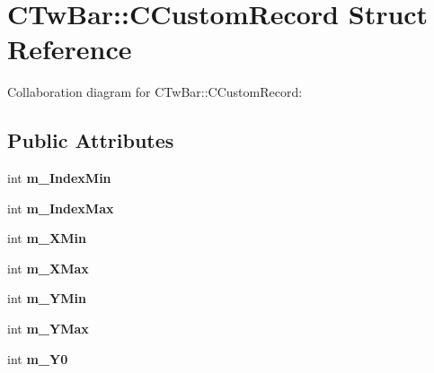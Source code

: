 \hypertarget{struct_c_tw_bar_1_1_c_custom_record}{\section{C\+Tw\+Bar\+:\+:C\+Custom\+Record Struct Reference}
\label{struct_c_tw_bar_1_1_c_custom_record}
}


Collaboration diagram for C\+Tw\+Bar\+:\+:C\+Custom\+Record\+:
\subsection*{Public Attributes}
\begin{DoxyCompactItemize}
\item 
\hypertarget{struct_c_tw_bar_1_1_c_custom_record_a9fc96cdb43061c76566574e1085cc4ac}{int {\bfseries m\+\_\+\+Index\+Min}}\label{struct_c_tw_bar_1_1_c_custom_record_a9fc96cdb43061c76566574e1085cc4ac}

\item 
\hypertarget{struct_c_tw_bar_1_1_c_custom_record_ad8e5f8a30620613c39c8fc06e60280a9}{int {\bfseries m\+\_\+\+Index\+Max}}\label{struct_c_tw_bar_1_1_c_custom_record_ad8e5f8a30620613c39c8fc06e60280a9}

\item 
\hypertarget{struct_c_tw_bar_1_1_c_custom_record_a8c59541807f3da20a45922df8877e466}{int {\bfseries m\+\_\+\+X\+Min}}\label{struct_c_tw_bar_1_1_c_custom_record_a8c59541807f3da20a45922df8877e466}

\item 
\hypertarget{struct_c_tw_bar_1_1_c_custom_record_afdefdd1612e0273a442c2b08b4b56e5d}{int {\bfseries m\+\_\+\+X\+Max}}\label{struct_c_tw_bar_1_1_c_custom_record_afdefdd1612e0273a442c2b08b4b56e5d}

\item 
\hypertarget{struct_c_tw_bar_1_1_c_custom_record_aee70f45e8205605a15c178026ff934f6}{int {\bfseries m\+\_\+\+Y\+Min}}\label{struct_c_tw_bar_1_1_c_custom_record_aee70f45e8205605a15c178026ff934f6}

\item 
\hypertarget{struct_c_tw_bar_1_1_c_custom_record_af3d12e5336210c58d1aef78567c1f8c0}{int {\bfseries m\+\_\+\+Y\+Max}}\label{struct_c_tw_bar_1_1_c_custom_record_af3d12e5336210c58d1aef78567c1f8c0}

\item 
\hypertarget{struct_c_tw_bar_1_1_c_custom_record_a00b39bf93e762626bb46a7fe3d4c4501}{int {\bfseries m\+\_\+\+Y0}}\label{struct_c_tw_bar_1_1_c_custom_record_a00b39bf93e762626bb46a7fe3d4c4501}


\end{DoxyCompactItemize}
